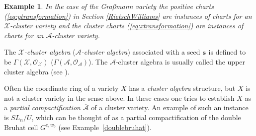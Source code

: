 \documentclass{emsprocart}
\newtheorem{example}[theorem]{Example}
\theoremstyle{definition}
\begin{document}
\begin{example}\rm In the case of the Gra\ss mann variety the positive charts (\ref{eq:ytransformation}) in Section \ref{RietschWilliams} are instances of charts for 
an $\mathcal X$-cluster variety and the cluster charts (\ref{eq:xtransformation}) are instances of charts for an $\mathcal A$-cluster variety.
\end{example}

The {\it $\mathcal{X}$-cluster algebra} ({\it $\mathcal A$-cluster algebra}) associated with a seed ${\bf s}$ is defined to be $\Gamma(\mathcal X, \mathcal{O}_{\mathcal X})$ ($\Gamma(\mathcal A, \mathcal{O}_{\mathcal A})$).  The $\mathcal A$-cluster algebra is usually called the upper cluster algebra (see \cite{BFZ}).

Often the coordinate ring of
a variety $X$ has a {\it cluster algebra} structure, but $X$ is not a cluster variety in the sense above.
In these cases one tries to establish $X$ as a {\it partial compactification} $\overline{\mathcal A}$ of a cluster variety.
An example of such an instance is $SL_n/U$, which can be thought of as a partial compactification of the double Bruhat cell
$G^{e,w_0}$ (see Example~\ref{doublebruhat}).
\end{document}
